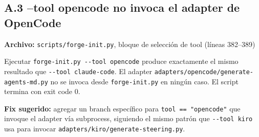 \documentclass[12pt,a4paper]{article}
\begin{document}
\subsection*{A.3 --tool opencode no invoca el adapter de OpenCode}

\textbf{Archivo:} \texttt{scripts/forge-init.py}, bloque de selecci\'on de tool
(l\'ineas 382--389)

Ejecutar \texttt{forge-init.py -{}-tool opencode} produce exactamente el mismo
resultado que \texttt{-{}-tool claude-code}. El adapter
\texttt{adapters/opencode/generate-agents-md.py} no se invoca desde
\texttt{forge-init.py} en ning\'un caso. El script termina con exit code 0.

\textbf{Fix sugerido:} agregar un branch espec\'ifico para
\texttt{tool == "opencode"} que invoque el adapter v\'ia subprocess, siguiendo el
mismo patr\'on que \texttt{-{}-tool kiro} usa para invocar
\texttt{adapters/kiro/generate-steering.py}.
\end{document}
